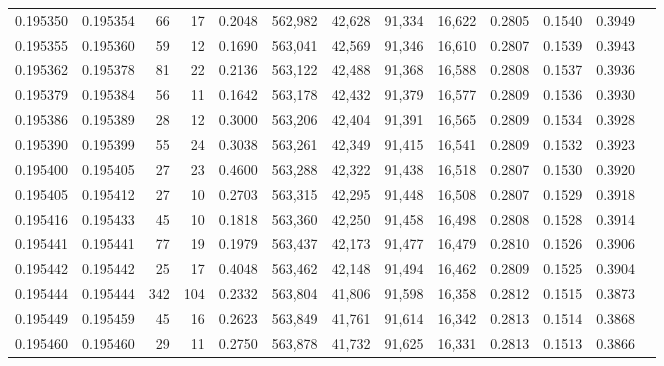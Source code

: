 \begin{tabular}{rrrrrrrrrrrrr}
0.195350 & 0.195354 &    66 &  17 &                                     0.2048 & 562,982 &  42,628 &  91,334 &  16,622 & 0.2805 & 0.1540 & 0.3949 \\
0.195355 & 0.195360 &    59 &  12 &                                     0.1690 & 563,041 &  42,569 &  91,346 &  16,610 & 0.2807 & 0.1539 & 0.3943 \\
0.195362 & 0.195378 &    81 &  22 &                                     0.2136 & 563,122 &  42,488 &  91,368 &  16,588 & 0.2808 & 0.1537 & 0.3936 \\
0.195379 & 0.195384 &    56 &  11 &                                     0.1642 & 563,178 &  42,432 &  91,379 &  16,577 & 0.2809 & 0.1536 & 0.3930 \\
0.195386 & 0.195389 &    28 &  12 &                                     0.3000 & 563,206 &  42,404 &  91,391 &  16,565 & 0.2809 & 0.1534 & 0.3928 \\
0.195390 & 0.195399 &    55 &  24 &                                     0.3038 & 563,261 &  42,349 &  91,415 &  16,541 & 0.2809 & 0.1532 & 0.3923 \\
0.195400 & 0.195405 &    27 &  23 &                                     0.4600 & 563,288 &  42,322 &  91,438 &  16,518 & 0.2807 & 0.1530 & 0.3920 \\
0.195405 & 0.195412 &    27 &  10 &                                     0.2703 & 563,315 &  42,295 &  91,448 &  16,508 & 0.2807 & 0.1529 & 0.3918 \\
0.195416 & 0.195433 &    45 &  10 &                                     0.1818 & 563,360 &  42,250 &  91,458 &  16,498 & 0.2808 & 0.1528 & 0.3914 \\
0.195441 & 0.195441 &    77 &  19 &                                     0.1979 & 563,437 &  42,173 &  91,477 &  16,479 & 0.2810 & 0.1526 & 0.3906 \\
0.195442 & 0.195442 &    25 &  17 &                                     0.4048 & 563,462 &  42,148 &  91,494 &  16,462 & 0.2809 & 0.1525 & 0.3904 \\
0.195444 & 0.195444 &   342 & 104 &                                     0.2332 & 563,804 &  41,806 &  91,598 &  16,358 & 0.2812 & 0.1515 & 0.3873 \\
0.195449 & 0.195459 &    45 &  16 &                                     0.2623 & 563,849 &  41,761 &  91,614 &  16,342 & 0.2813 & 0.1514 & 0.3868 \\
0.195460 & 0.195460 &    29 &  11 &                                     0.2750 & 563,878 &  41,732 &  91,625 &  16,331 & 0.2813 & 0.1513 & 0.3866 \\

\end{tabular}
